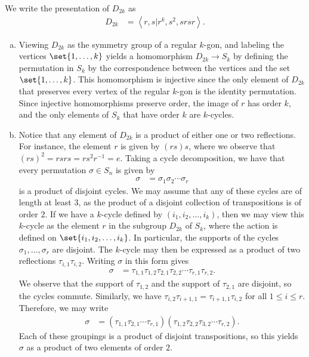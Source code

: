 \documentclass[10pt]{mypackage}
\begin{document}
\begin{solution}
  We write the presentation of $D_{2k}$ as
  \begin{align*}
    D_{2k} &= \left\langle r,s | r^{k},s^2,srsr \right\rangle.
  \end{align*}
  \begin{enumerate}[(a)]
    \item Viewing $D_{2k}$ as the symmetry group of a regular $k$-gon, and labeling the vertices $\set{1,\dots,k}$ yields a homomorphism $D_{2k}\rightarrow S_k$ by defining the permutation in $S_k$ by the correspondence between the vertices and the set $\set{1,\dots,k}$. This homomorphism is injective since the only element of $D_{2k}$ that preserves every vertex of the regular $k$-gon is the identity permutation. Since injective homomorphisms preserve order, the image of $r$ has order $k$, and the only elements of $S_k$ that have order $k$ are $k$-cycles.
    \item Notice that any element of $D_{2k}$ is a product of either one or two reflections. For instance, the element $r$ is given by $(rs)s$, where we observe that $(rs)^2 = rsrs = rs^2r^{-1} = e$. Taking a cycle decomposition, we have that every permutation $\sigma\in S_n$ is given by
      \begin{align*}
        \sigma &= \sigma_1\sigma_2\cdots \sigma_r
      \end{align*}
      is a product of disjoint cycles. We may assume that any of these cycles are of length at least $3$, as the product of a disjoint collection of transpositions is of order $2$. If we have a $k$-cycle defined by $\left( i_1,i_2,\dots,i_k \right)$, then we may view this $k$-cycle as the element $r$ in the subgroup $D_{2k}$ of $S_k$, where the action is defined on $\set{i_1,i_2,\dots,i_k}$. In particular, the supports of the cycles $\sigma_1,\dots,\sigma_r$ are disjoint. The $k$-cycle may then be expressed as a product of two reflections $\tau_{i,1}\tau_{i,2}$. Writing $\sigma$ in this form gives
      \begin{align*}
        \sigma &= \tau_{1,1}\tau_{1,2}\tau_{2,1}\tau_{2,2}\cdots \tau_{r,1}\tau_{r,2}.
      \end{align*}
      We observe that the support of $\tau_{1,2}$ and the support of $\tau_{2,1}$ are disjoint, so the cycles commute. Similarly, we have $\tau_{i,2}\tau_{i+1,1} = \tau_{i+1,1}\tau_{i,2}$ for all $1\leq i \leq r$. Therefore, we may write
      \begin{align*}
        \sigma &= \left( \tau_{1,1}\tau_{2,1}\cdots \tau_{r,1} \right)\left( \tau_{1,2}\tau_{2,2}\tau_{3,2}\cdots \tau_{r,2} \right).
      \end{align*}
      Each of these groupings is a product of disjoint transpositions, so this yields $\sigma$ as a product of two elements of order $2$.
  \end{enumerate}
\end{solution}
\end{document}
